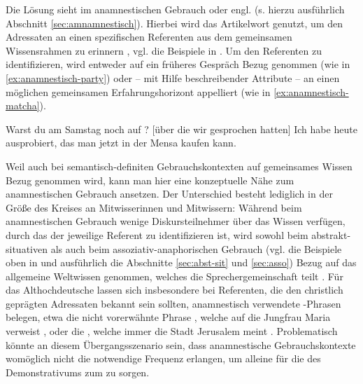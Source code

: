 \noindent
Die Lösung sieht \textcite{Himmelmann1997} im anamnestischen  Gebrauch oder engl.  (s. hierzu ausführlich Abschnitt \ref{sec:amnamnestisch}). Hierbei wird das Artikelwort genutzt, um den Adressaten an einen spezifischen Referenten aus dem gemeinsamen Wissensrahmen zu erinnern \parencite[61 und 81]{Himmelmann1997}, vgl. die Beispiele in . Um den Referenten zu identifizieren, wird  entweder auf ein früheres Gespräch Bezug genommen (wie in \ref{ex:anamnestisch-party}) oder -- mit Hilfe beschreibender Attribute --  an einen möglichen gemeinsamen Erfahrungshorizont appelliert (wie in \ref{ex:anamnestisch-matcha}).   

 \begin{exe}
	\ex 
	\begin{xlist} \label{ex:himmelmann}
		\ex \label{ex:anamnestisch-party}  Warst du am Samstag noch auf ? [über die wir gesprochen hatten]
		\ex \label{ex:anamnestisch-matcha} Ich habe heute  ausprobiert, das man jetzt in der Mensa kaufen kann.  
		\end{xlist}
\end{exe}

\noindent
Weil auch bei semantisch-definiten Gebrauchskontexten  auf gemeinsames Wissen Bezug genommen wird, kann man hier eine konzeptuelle Nähe zum anamnestischen  Gebrauch ansetzen. Der Unterschied besteht lediglich in der Größe des Kreises an Mitwisserinnen und Mitwissern: Während beim anamnestischen  Gebrauch wenige  Diskursteilnehmer über das Wissen verfügen, durch das der jeweilige Referent zu identifizieren ist,  wird sowohl beim abstrakt-situativen  als auch beim assoziativ-anaphorischen  Gebrauch (vgl. die Beispiele oben in  und ausführlich die Abschnitte \ref{sec:abst-sit} und \ref{sec:asso}) Bezug auf das allgemeine Weltwissen genommen, welches die Sprechergemeinschaft teilt \parencite[95]{Himmelmann1997}. Für das Althochdeutsche lassen sich insbesondere bei Referenten, die den christlich geprägten Adressaten bekannt sein sollten, anamnestisch  verwendete -Phrasen belegen, etwa die nicht vorerwähnte Phrase , welche auf die Jungfrau Maria verweist \parencite[74]{Szczepaniak2011a}, oder die  , welche immer die Stadt Jerusalem meint \parencite{Flick2018}. Problematisch könnte an diesem Übergangsszenario sein, dass anamnestische  Gebrauchskontexte womöglich nicht die notwendige Frequenz erlangen, um alleine für die  des Demonstrativums  zum  zu sorgen. 

